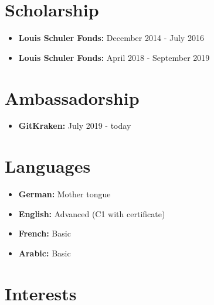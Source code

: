 \documentclass[11pt,a4paper,sans]{moderncv}        %
\begin{document}

\section{Scholarship}

\begin{itemize}
	
	\setlength\itemsep{1em}
	
	\item \textbf{Louis Schuler Fonds:}  December 2014 - July 2016
	
	\item \textbf{Louis Schuler Fonds:}  April 2018 - September 2019
	
\end{itemize}

\section{Ambassadorship}

\begin{itemize}

\setlength\itemsep{1em}

\item \textbf{GitKraken:}  July 2019 - today

\end{itemize}

\section{Languages}

\begin{itemize}

\setlength\itemsep{1em}

\item \textbf{German:} Mother tongue

\item \textbf{English:}  Advanced (C1 with certificate)

\item \textbf{French:}  Basic

\item \textbf{Arabic:}  Basic


\end{itemize}

\section{Interests}
\end{document}
